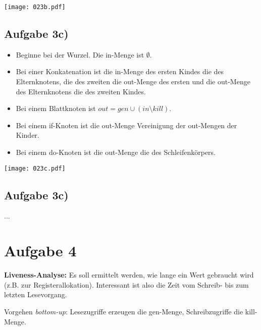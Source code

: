 \documentclass[a4paper,10pt]{article}
\begin{document}
\begin{center}
\texttt{[image: 023b.pdf]}
\end{center}

\newpage
\subsection*{Aufgabe 3c)}

\begin{itemize}
    \item Beginne bei der Wurzel. Die in-Menge ist $\emptyset$.
    \item Bei einer Konkatenation ist die in-Menge des ersten Kindes die des Elternknotens,
        die des zweiten die out-Menge des ersten und die out-Menge des Elternknotens die des
        zweiten Kindes.
    \item Bei einem Blattknoten ist $out = gen \cup (in \setminus kill)$.
    \item Bei einem if-Knoten ist die out-Menge Vereinigung der out-Mengen der Kinder.
    \item Bei einem do-Knoten ist die out-Menge die des Schleifenkörpers.
\end{itemize}


\begin{center}
\texttt{[image: 023c.pdf]}
\end{center}

\subsection*{Aufgabe 3c)}

...

\newpage
\section*{Aufgabe 4}

\textbf{Liveness-Analyse:} Es soll ermittelt werden, wie lange ein Wert gebraucht wird (z.B. zur
Registerallokation). Interessant ist also die Zeit vom Schreib- bis zum letzten Lesevorgang.

Vorgehen \textit{bottom-up}: Lesezugriffe erzeugen die gen-Menge, Schreibzugriffe die kill-Menge.
\end{document}

